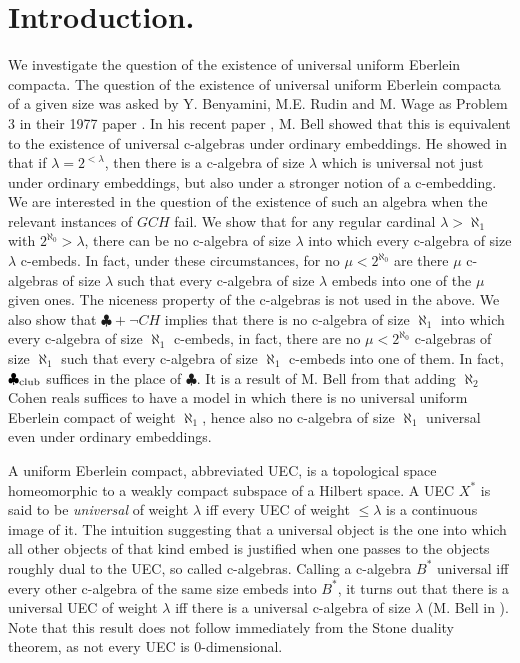 \section{Introduction.}
We investigate the question of the existence of
universal uniform Eberlein compacta. 
The question of the existence of universal uniform Eberlein
compacta of a given size was asked by Y. Benyamini, M.E. Rudin and
M. Wage as Problem 3 in their 1977 paper \cite{Rudin}.
In his recent paper \cite{Bell},
M. Bell showed that this is equivalent to the existence of universal
c-algebras under ordinary embeddings. He showed in \cite{Bell}
that if $\lambda=2^{<\lambda}$, then there is a c-algebra
of size $\lambda$ which is universal not just under ordinary embeddings,
but also under a stronger notion of a c-embedding.
We are interested in the question of the existence of such an algebra
when the relevant instances of $GCH$ fail.
We show that for any  regular cardinal $\lambda>\aleph_1$
with $2^{\aleph_0}>\lambda$, there can be no c-algebra
of size $\lambda$ into which every c-algebra of size $\lambda$ c-embeds.
In fact, under these circumstances, for no $\mu<2^{\aleph_0}$
are there $\mu$ c-algebras of size $\lambda$ such that every
c-algebra of size $\lambda$ embeds into
one of the $\mu$ given ones.
The niceness property of the c-algebras is not used in the above.
We also show that $\clubsuit + \neg CH$ implies that there is no c-algebra
of size $\aleph_1$ into which every c-algebra of size $\aleph_1$ c-embeds,
in fact, there are no $\mu<2^{\aleph_0}$ c-algebras of
size $\aleph_1$ such that every c-algebra of size $\aleph_1$ c-embeds
into one of them. 
In fact, $\clubsuit_{{\rm club}}$
suffices in the place of $\clubsuit$.
It is a result of M. Bell from \cite{Bell} that adding
$\aleph_2$ Cohen reals suffices to have a model in which there is no
universal uniform Eberlein compact of weight $\aleph_1$, hence also
no c-algebra of size $\aleph_1$ universal even under ordinary embeddings.

A uniform Eberlein compact, abbreviated UEC, is
a topological space homeomorphic to a
weakly compact subspace of a Hilbert space.
A UEC $X^\ast$ is said to be
{\em universal}
of weight $\lambda$ iff every UEC of weight $\le\lambda$ is a continuous image of it.
The intuition suggesting
that a universal object is the one into which all other objects of that
kind embed is justified when one passes to the objects roughly dual to the
UEC, so called c-algebras. Calling a c-algebra $B^\ast$ universal iff every
other c-algebra of the same size embeds into $B^\ast$, it turns out that
there is a universal UEC of weight $\lambda$ iff there is a universal
c-algebra of size $\lambda$ (M. Bell in \cite{Bell}).
Note that this result does not follow immediately from the Stone duality
theorem, as not every UEC is 0-dimensional.

